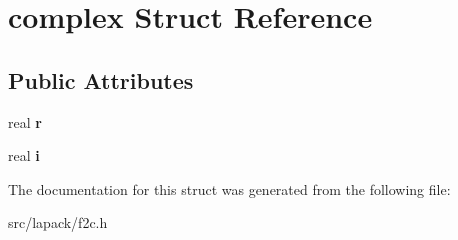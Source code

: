 \hypertarget{structcomplex}{\section{complex \-Struct \-Reference}
\label{structcomplex}
}
\subsection*{\-Public \-Attributes}
\begin{DoxyCompactItemize}
\item 
\hypertarget{structcomplex_a03cba9844d71e49f4ddf7c5f3dd45822}{real {\bfseries r}}\label{structcomplex_a03cba9844d71e49f4ddf7c5f3dd45822}

\item 
\hypertarget{structcomplex_aa55283d87e8d89c794bac746fb11d524}{real {\bfseries i}}\label{structcomplex_aa55283d87e8d89c794bac746fb11d524}

\end{DoxyCompactItemize}


\-The documentation for this struct was generated from the following file\-:\begin{DoxyCompactItemize}
\item 
src/lapack/f2c.\-h\end{DoxyCompactItemize}
